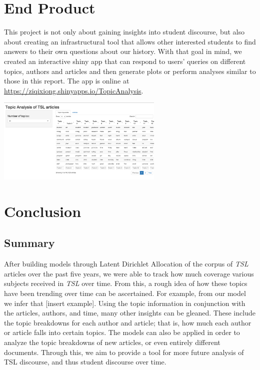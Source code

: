 \documentclass[a4paper]{article}
\begin{document}
\section{End Product}
This project is not only about gaining insights into student discourse, but also about creating an infrastructural tool that allows other interested students to find answers to their own questions about our history. With that goal in mind, we created an interactive shiny app that can respond to users' queries on different topics, authors and articles and then generate plots or perform analyses similar to those in this report. The app is online at \href{https://ziqixiong.shinyapps.io/TopicAnalysis}{https://ziqixiong.shinyapps.io/TopicAnalysis}.
\vspace{1cm}

\includegraphics[width=300px]{shinydemo.png}

\section{Conclusion}
\subsection{Summary}
After building models through Latent Dirichlet Allocation of the corpus of \textit{TSL} articles over the past five years, we were able to track how much coverage various subjects received in \textit{TSL} over time. From this, a rough idea of how these topics have been trending over time can be ascertained. For example, from our model we infer that [insert example]. Using the topic information in conjunction with the articles, authors, and time, many other insights can be gleaned. These include the topic breakdowns for each author and article; that is, how much each author or article falls into certain topics. The models can also be applied in order to analyze the topic breakdowns of new articles, or even entirely different documents. Through this, we aim to provide a tool for more future analysis of TSL discourse, and thus student discourse over time.
\end{document}
